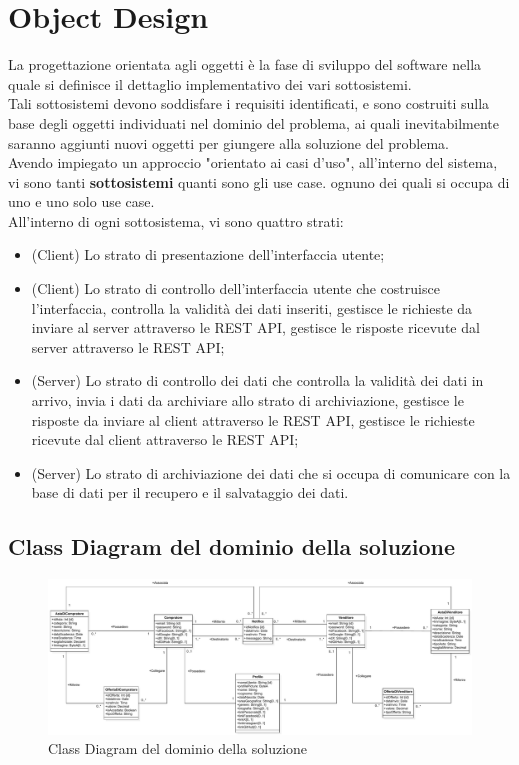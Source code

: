 \chapter{Object Design}
    La progettazione orientata agli oggetti è la fase di sviluppo del software nella quale si definisce il dettaglio implementativo dei vari sottosistemi. \\
    Tali sottosistemi devono soddisfare i requisiti identificati, e sono costruiti sulla base degli oggetti individuati nel dominio del problema, ai quali inevitabilmente saranno aggiunti nuovi oggetti per giungere alla soluzione del problema. \\
    Avendo impiegato un approccio "orientato ai casi d'uso", all'interno del sistema, vi sono tanti \textbf{sottosistemi} quanti sono gli use case. ognuno dei quali si occupa di uno e uno solo use case. \\
    All'interno di ogni sottosistema, vi sono quattro strati:
    \begin{itemize}
        \item (Client) Lo strato di presentazione dell'interfaccia utente;
        \item (Client) Lo strato di controllo dell'interfaccia utente che costruisce l'interfaccia, controlla la validità dei dati inseriti, gestisce le richieste da inviare al server attraverso le REST API, gestisce le risposte ricevute dal server attraverso le REST API;
        \item (Server) Lo strato di controllo dei dati che controlla la validità dei dati in arrivo, invia i dati da archiviare allo strato di archiviazione, gestisce le risposte da inviare al client attraverso le REST API, gestisce le richieste ricevute dal client attraverso le REST API;
        \item (Server) Lo strato di archiviazione dei dati che si occupa di comunicare con la base di dati per il recupero e il salvataggio dei dati.
    \end{itemize}
    

    \section{Class Diagram del dominio della soluzione}
        \begin{figure}[htbp!]
            \centering
                \includegraphics[width=1\linewidth]{Immagini/Diagrammi/Class Diagram/ClassDiagramRistrutturato.pdf}
            \caption{Class Diagram del dominio della soluzione}
            \label{fig:Class Diagram del dominio della soluzione}
        \end{figure}

